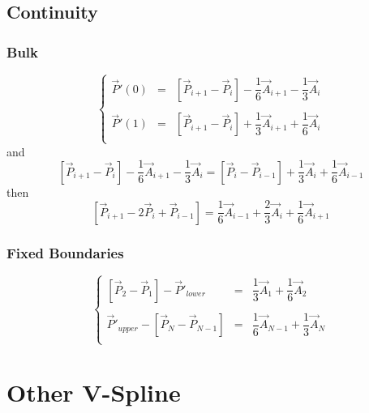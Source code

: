 \documentclass[aps,12pt]{revtex4}
\begin{document}
\subsection{Continuity}

\subsubsection{Bulk}

\begin{equation}
\left\lbrace
\begin{array}{rcl}
	\vec{P}'(0) & = & \left[\vec{P}_{i+1}-\vec{P}_i\right] - \dfrac{1}{6} \vec{A}_{i+1} - \dfrac{1}{3}\vec{A}_{i} \\
	\\
	\vec{P}'(1) & = & \left[\vec{P}_{i+1}-\vec{P}_i\right] + \dfrac{1}{3} \vec{A}_{i+1} + \dfrac{1}{6}\vec{A}_{i}\\
\end{array}
\right.
\end{equation}
and
\begin{equation}
	 \left[\vec{P}_{i+1}-\vec{P}_i\right] - \dfrac{1}{6} \vec{A}_{i+1} - \dfrac{1}{3}\vec{A}_{i}
	 =
	 \left[\vec{P}_{i}-\vec{P}_{i-1}\right] + \dfrac{1}{3} \vec{A}_{i} + \dfrac{1}{6}\vec{A}_{i-1}
\end{equation}
then
\begin{equation}
	 \left[\vec{P}_{i+1}-2\vec{P}_i+\vec{P}_{i-1}\right] = \dfrac{1}{6} \vec{A}_{i-1} + \dfrac{2}{3}\vec{A}_{i} + \dfrac{1}{6} \vec{A}_{i+1}
\end{equation}

\subsubsection{Fixed Boundaries}
 
\begin{equation}
\left\lbrace
\begin{array}{rcl}
 	 \left[\vec{P}_{2}-\vec{P}_1\right] - \vec{P}'_{lower}& = &\dfrac{1}{3} \vec{A}_1 + \dfrac{1}{6} \vec{A}_{2}\\
	 \\
	\vec{P}'_{upper} - \left[\vec{P}_N - \vec{P}_{N-1}\right] & = & \dfrac{1}{6} \vec{A}_{N-1} + \dfrac{1}{3} \vec{A}_{N}\\
\end{array}
\right.
\end{equation}

\section{Other V-Spline}
\end{document}
